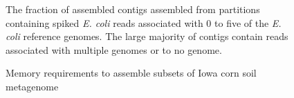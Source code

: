 \documentclass[11pt]{article} %
\begin{document}
\begin{figure}[h!]
\caption{The fraction of assembled contigs assembled from partitions containing spiked \emph{E. coli} reads associated with 0 to five of the \emph{E. coli} reference genomes.  The large majority of contigs contain reads associated with multiple genomes or to no genome.}
\label{fractionassembled}
\end{figure}

\begin{figure}[h!]
\caption{Memory requirements to assemble subsets of Iowa corn soil metagenome}
\label{memory}
\end{figure}
\end{document}
